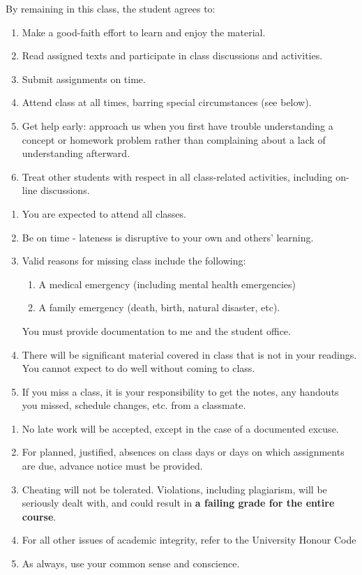 \documentclass[a4paper,landscape,headrule,footrule]{foils}
\begin{document}
By remaining in this class, the student agrees to:
\begin{enumerate}
\item  Make a good-faith effort to learn and enjoy the material.
\item  Read assigned texts and participate in class discussions and activities.
\item Submit assignments on time.
\item Attend class at all times, barring special circumstances (see below).
\item Get help early: approach us when you first have trouble understanding a concept or homework problem rather than complaining about a lack of understanding afterward.
\item Treat other students with respect in all class-related activities, including on-line discussions.
\end{enumerate}
\begin{enumerate}
\item You are expected to attend all classes.
\item Be on time - lateness is disruptive to your own and others' learning.
\item Valid reasons for missing class include the following:
\begin{enumerate}
\item A medical emergency (including mental health emergencies)
\item A family emergency (death, birth, natural disaster, etc).
\end{enumerate}
You must provide documentation to me and the student office.
\item There will be significant material covered in class that is not in your readings.  You cannot expect to do well without coming to class.
\item If you miss a class, it is your responsibility to get the notes, any handouts you missed, schedule changes, etc. from a classmate.
\end{enumerate}

\begin{enumerate}
\item No late work will be accepted, except in the case of a documented excuse.
\item For planned, justified, absences on class days or days on which assignments are due, advance notice must be provided.
\item Cheating will not be tolerated. Violations, including plagiarism, will be seriously dealt with, and could result in \textbf{a failing grade for the entire course}.
\item For all other issues of academic integrity, refer to the University Honour Code
\item As always, use your common sense and conscience.
\end{enumerate}
\end{document}

